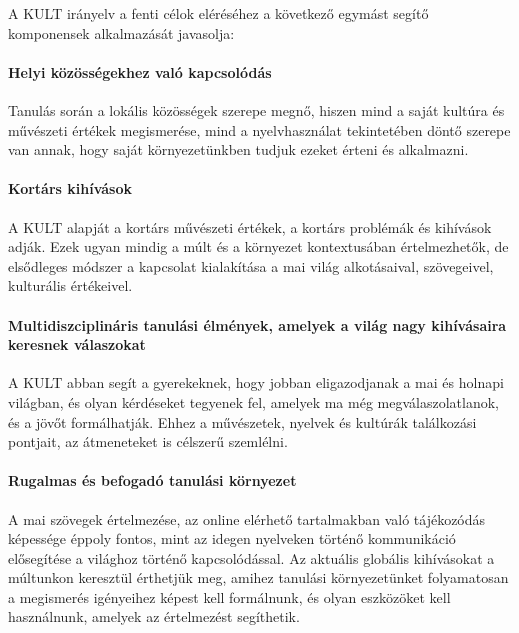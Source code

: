 A KULT irányelv a fenti célok eléréséhez a következő egymást segítő komponensek alkalmazását javasolja:

\paragraph{Helyi közösségekhez való kapcsolódás}

Tanulás során a lokális közösségek szerepe megnő, hiszen mind a saját kultúra és művészeti értékek megismerése, mind a nyelvhasználat tekintetében döntő szerepe van annak, hogy saját környezetünkben  tudjuk ezeket érteni és alkalmazni.

\paragraph{Kortárs kihívások}

A KULT alapját a kortárs művészeti értékek, a kortárs problémák és kihívások adják. Ezek ugyan mindig a múlt és a környezet kontextusában értelmezhetők, de elsődleges módszer a kapcsolat kialakítása a mai világ alkotásaival, szövegeivel, kulturális értékeivel.

\paragraph{Multidiszciplináris tanulási élmények, amelyek a világ nagy kihívásaira keresnek válaszokat}

A KULT abban segít a gyerekeknek, hogy jobban eligazodjanak a mai és holnapi világban, és olyan kérdéseket tegyenek fel, amelyek ma még megválaszolatlanok, és a jövőt formálhatják. Ehhez a művészetek, nyelvek és kultúrák találkozási pontjait, az átmeneteket is célszerű szemlélni.

\paragraph{Rugalmas és befogadó tanulási környezet}

A mai szövegek értelmezése, az online elérhető tartalmakban való
tájékozódás képessége éppoly fontos, mint az idegen nyelveken történő
kommunikáció elősegítése a világhoz történő kapcsolódással. Az
aktuális globális kihívásokat a múltunkon keresztül érthetjük meg,
amihez tanulási környezetünket folyamatosan a\linebreak
megismerés igényeihez képest kell formálnunk, és olyan eszközöket kell használnunk, amelyek az értelmezést segíthetik.

